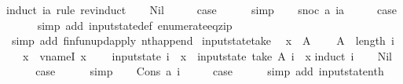 \begin{isabellebody}
%
\isadelimproof
%
\endisadelimproof
%
\isatagproof
{}\isamarkupfalse%
{\isacharparenleft}induct\ ia\ rule{\isacharcolon}\ rev{\isacharunderscore}induct{\isacharparenright}\isanewline
\ \ \isamarkupfalse%
\ Nil\isanewline
\ \ \isamarkupfalse%
\ \isamarkupfalse%
\ {\isacharquery}case\isanewline
\ \ \ \ \isamarkupfalse%
\ simp\isanewline
{}\isamarkupfalse%
\isanewline
\ \ \isamarkupfalse%
\ {\isacharparenleft}snoc\ a\ ia{\isacharparenright}\isanewline
\ \ \isamarkupfalse%
\ \isamarkupfalse%
\ {\isacharquery}case\isanewline
\ \ \ \ \isamarkupfalse%
\ {\isacharparenleft}simp\ add{\isacharcolon}\ input{}state{\isacharunderscore}def\ enumerate{\isacharunderscore}eq{\isacharunderscore}zip{\isacharparenright}\isanewline
\ \ \ \ \isamarkupfalse%
\ {\isacharparenleft}simp\ add{\isacharcolon}\ finfun{\isacharunderscore}upd{\isacharunderscore}apply\ nth{\isacharunderscore}append{\isacharparenright}\isanewline
{}\isamarkupfalse%
%
\endisatagproof
{\isafoldproof}%
%
\isadelimproof
\isanewline
%
\endisadelimproof
\isanewline
{}\isamarkupfalse%
\ input{}state{\isacharunderscore}take{\isacharcolon}\isanewline
\ \ {\isachardoublequoteopen}x{}\ {\isacharless}\ A\ {\isasymLongrightarrow}\isanewline
\ \ \ A\ {\isasymle}\ length\ i\ {\isasymLongrightarrow}\isanewline
\ \ \ x\ {\isacharequal}\ vname{\isachardot}I\ x{}\ {\isasymLongrightarrow}\isanewline
\ \ \ input{}state\ i\ {\isachardollar}\ x{}\ {\isacharequal}\ input{}state\ {\isacharparenleft}take\ A\ i{\isacharparenright}\ {\isachardollar}\ x{}{\isachardoublequoteclose}\isanewline
%
\isadelimproof
%
\endisadelimproof
%
\isatagproof
{}\isamarkupfalse%
{\isacharparenleft}induct\ i{\isacharparenright}\isanewline
\ \ \isamarkupfalse%
\ Nil\isanewline
\ \ \isamarkupfalse%
\ \isamarkupfalse%
\ {\isacharquery}case\isanewline
\ \ \ \ \isamarkupfalse%
\ simp\isanewline
{}\isamarkupfalse%
\isanewline
\ \ \isamarkupfalse%
\ {\isacharparenleft}Cons\ a\ i{\isacharparenright}\isanewline
\ \ \isamarkupfalse%
\ \isamarkupfalse%
\ {\isacharquery}case\isanewline
\ \ \ \ \isamarkupfalse%
\ {\isacharparenleft}simp\ add{\isacharcolon}\ input{}state{\isacharunderscore}nth{\isacharparenright}\isanewline

\end{isabellebody}
